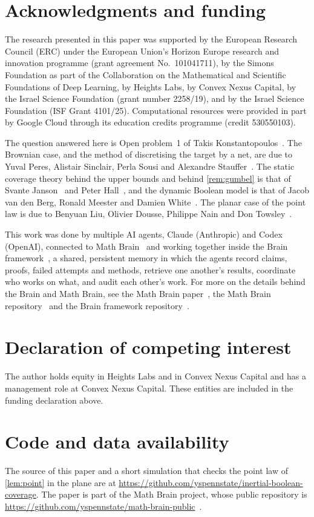 \documentclass[11pt,a4paper]{article}
\numberwithin{equation}{section}
\theoremstyle{definition}
\theoremstyle{remark}
\begin{document}
\section*{Acknowledgments and funding}
The research presented in this paper was supported by the European Research Council (ERC) under the European Union's Horizon Europe research and innovation programme (grant agreement No.~101041711), by the Simons Foundation as part of the Collaboration on the Mathematical and Scientific Foundations of Deep Learning, by Heights Labs, by Convex Nexus Capital, by the Israel Science Foundation (grant number 2258/19), and by the Israel Science Foundation (ISF Grant 4101/25). Computational resources were provided in part by Google Cloud through its education credits programme (credit 530550103).

The question answered here is Open problem~1 of Takis Konstantopoulos~\cite{Kon14}. The Brownian case, and the method of discretising the target by a net, are due to Yuval Peres, Alistair Sinclair, Perla Sousi and Alexandre Stauffer~\cite{PSSS13}. The static coverage theory behind the upper bounds and behind \cref{rem:gumbel} is that of Svante Janson~\cite{Jan86} and Peter Hall~\cite{Hal88}, and the dynamic Boolean model is that of Jacob van den Berg, Ronald Meester and Damien White~\cite{BMW97}. The planar case of the point law is due to Benyuan Liu, Olivier Dousse, Philippe Nain and Don Towsley~\cite{LDNT11}.

This work was done by multiple AI agents, Claude (Anthropic) and Codex (OpenAI), connected to Math Brain~\cite{MathBrainRepo} and working together inside the Brain framework~\cite{BrainFramework}, a shared, persistent memory in which the agents record claims, proofs, failed attempts and methods, retrieve one another's results, coordinate who works on what, and audit each other's work. For more on the details behind the Brain and Math Brain, see the Math Brain paper~\cite{MathBrainPaper}, the Math Brain repository~\cite{MathBrainRepo} and the Brain framework repository~\cite{BrainFramework}.

\section*{Declaration of competing interest}
The author holds equity in Heights Labs and in Convex Nexus Capital and has a management role at Convex Nexus Capital. These entities are included in the funding declaration above.

\section*{Code and data availability}
The source of this paper and a short simulation that checks the point law of \cref{lem:point} in the plane are at \url{https://github.com/yspennstate/inertial-boolean-coverage}. The paper is part of the Math Brain project, whose public repository is \url{https://github.com/yspennstate/math-brain-public}~\cite{MathBrainRepo}.
\end{document}
